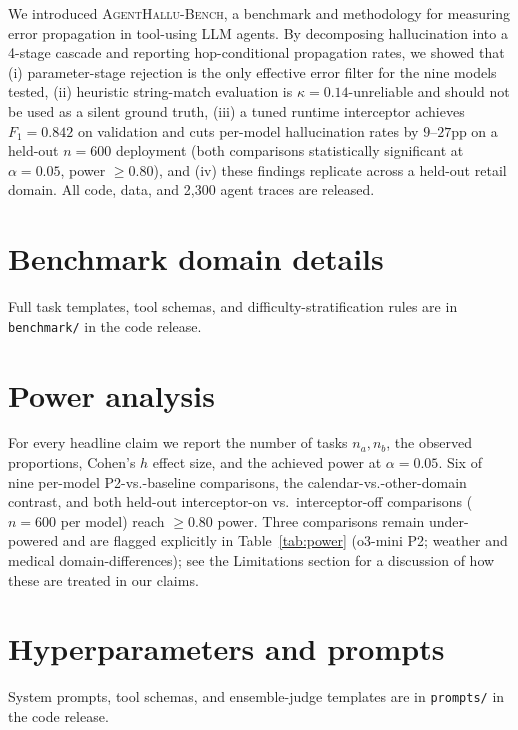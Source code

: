 \documentclass[11pt]{article}
\newcommand{\halluben}{\textsc{AgentHallu-Bench}}
\begin{document}
We introduced \halluben{}, a benchmark and methodology for measuring error propagation in tool-using LLM agents. By decomposing hallucination into a 4-stage cascade and reporting hop-conditional propagation rates, we showed that (i) parameter-stage rejection is the only effective error filter for the nine models tested, (ii) heuristic string-match evaluation is $\kappa\!=\!0.14$-unreliable and should not be used as a silent ground truth, (iii) a tuned runtime interceptor achieves $F_1\!=\!0.842$ on validation and cuts per-model hallucination rates by $9$--$27$pp on a held-out $n\!=\!600$ deployment (both comparisons statistically significant at $\alpha\!=\!0.05$, power $\geq\!0.80$), and (iv) these findings replicate across a held-out retail domain. All code, data, and 2{,}300 agent traces are released.




\appendix
\section{Benchmark domain details}
\label{app:domains}
Full task templates, tool schemas, and difficulty-stratification rules are in \texttt{benchmark/} in the code release.

\section{Power analysis}
\label{app:power}
For every headline claim we report the number of tasks $n_a, n_b$, the observed proportions, Cohen's $h$ effect size, and the achieved power at $\alpha\!=\!0.05$. Six of nine per-model P2-vs.-baseline comparisons, the calendar-vs.-other-domain contrast, and both held-out interceptor-on vs.\ interceptor-off comparisons ($n\!=\!600$ per model) reach $\geq\!0.80$ power. Three comparisons remain under-powered and are flagged explicitly in Table~\ref{tab:power} (o3-mini P2; weather and medical domain-differences); see the Limitations section for a discussion of how these are treated in our claims.



\section{Hyperparameters and prompts}
\label{app:prompts}
System prompts, tool schemas, and ensemble-judge templates are in \texttt{prompts/} in the code release.
\end{document}
